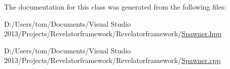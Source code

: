 The documentation for this class was generated from the following files\-:\begin{DoxyCompactItemize}
\item 
D\-:/\-Users/tom/\-Documents/\-Visual Studio 2013/\-Projects/\-Revelatorframework/\-Revelatorframework/\hyperlink{_spawner_8hpp}{Spawner.\-hpp}\item 
D\-:/\-Users/tom/\-Documents/\-Visual Studio 2013/\-Projects/\-Revelatorframework/\-Revelatorframework/\hyperlink{_spawner_8cpp}{Spawner.\-cpp}\end{DoxyCompactItemize}
